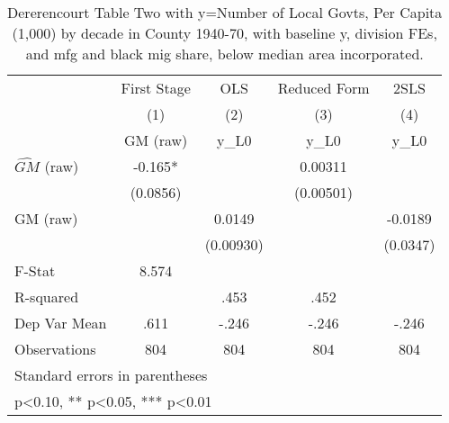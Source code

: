 \begin{table}[htbp]\centering
\def\sym#1{\ifmmode^{#1}\else\(^{#1}\)\fi}
\caption{Dererencourt Table Two with y=Number of Local Govts, Per Capita (1,000) by decade in County 1940-70, with baseline y, division FEs, and mfg and black mig share, below median area incorporated.}
\begin{tabular}{l*{4}{c}}
\toprule
                    & First Stage   &         OLS   &Reduced Form   &        2SLS   \\
                    &\multicolumn{1}{c}{(1)}&\multicolumn{1}{c}{(2)}&\multicolumn{1}{c}{(3)}&\multicolumn{1}{c}{(4)}\\
                    &\multicolumn{1}{c}{GM  (raw)}&\multicolumn{1}{c}{y\_L0}&\multicolumn{1}{c}{y\_L0}&\multicolumn{1}{c}{y\_L0}\\
\midrule
$\hat{GM}$ (raw)    &      -0.165*  &               &     0.00311   &               \\
                    &    (0.0856)   &               &   (0.00501)   &               \\
\addlinespace
GM  (raw)           &               &      0.0149   &               &     -0.0189   \\
                    &               &   (0.00930)   &               &    (0.0347)   \\
\midrule
F-Stat              &       8.574   &               &               &               \\
R-squared           &               &        .453   &        .452   &               \\
Dep Var Mean        &        .611   &       -.246   &       -.246   &       -.246   \\
Observations        &         804   &         804   &         804   &         804   \\
\bottomrule
\multicolumn{5}{l}{\footnotesize Standard errors in parentheses}\\
\multicolumn{5}{l}{\footnotesize * p<0.10, ** p<0.05, *** p<0.01}\\
\end{tabular}
\end{table}
